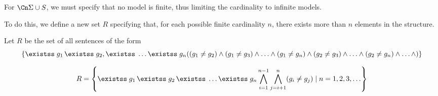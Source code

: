 For $\Cn \Sigma \cup S$, we must specify that no model is finite,
thus limiting the cardinality to infinite models.

To do this, we define a new set $R$ specifying that, for each possible finite cardinality
$n$, there exists more than $n$ elements in the structure.


Let $R$ be the set of all sentences of the form
\[ \set{ \exists g_1\, \exists g_2, \exists \ldots \exists g_n
((g_1 \neq g_2) \land (g_1 \neq g_3) \land \ldots \land (g_1 \neq g_n) \land (g_2 \neq g_3)
\land \ldots 
\land (g_2 \neq g_n) \land \ldots \land )} \]

\[
  R = \set{ \exists g_1\, \exists g_2\, \exists \ldots \exists g_n
    \bigwedge_{i=1}^{n-1} \bigwedge_{j=i+1}^{n} (g_i \neq g_j)
    \mid n = 1, 2, 3, \ldots }
\]


\bigskip
{}
